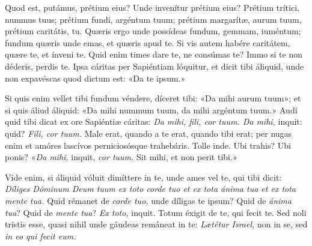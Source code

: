 {\noindent Quod est, putámus, prétium eius? Unde invenítur prétium eius? Prétium trítici, nummus tuus; prétium fundi, argéntum tuum; prétium margarítæ, aurum tuum, prétium caritátis, tu. Quæris ergo unde possídeas fundum, gemmam, iuméntum; fundum quæris unde emas, et quæris apud te. Si vis autem habére caritátem, quære te, et ínveni te. Quid enim times dare te, ne consúmas te? Immo si te non déderis, perdis te. Ipsa cáritas per Sapiéntiam lóquitur, et dicit tibi áliquid, unde non expavéscas quod dictum est: «Da te ipsum.»

\noindent Si quis enim vellet tibi fundum véndere, díceret tibi: «Da mihi aurum tuum»; et si quis áliud áliquid: «Da mihi nummum tuum, da mihi argéntum tuum.» Audi quid tibi dicat ex ore Sapiéntiæ cáritas: \emph{Da mihi, fili, cor tuum. Da mihi,} inquit: quid? \emph{Fili, cor tuum.} Male erat, quando a te erat, quando tibi erat; per nugas enim et amóres lascívos perniciosósque trahebáris. Tolle inde. Ubi trahis? Ubi ponis? «\emph{Da mihi,} inquit, \emph{cor tuum.} Sit mihi, et non perit tibi.»

\noindent Vide enim, si áliquid vóluit dimíttere in te, unde ames vel te, qui tibi dicit: \emph{Díliges Dóminum Deum tuum ex toto corde tuo et ex tota ánima tua et ex tota mente tua.} Quid rémanet de \emph{corde tuo,} unde díligas te ipsum? Quid de \emph{ánima tua}? Quid de \emph{mente tua}? \emph{Ex toto,} inquit. Totum éxigit de te, qui fecit te. Sed noli tristis esse, quasi nihil unde gáudeas remáneat in te: \emph{Lætétur Israel,} non in se, sed \emph{in eo qui fecit eum.}

\vfill
\pagebreak

 

\vspace{-5mm}



\vspace{3mm}

 

\vspace{-5mm}


\vfill
\pagebreak
}
\newcommand{\responsoriumbreve}{\pars{Responsorium breve.}

\cuminitiali{VI}{temporalia/resp-christefilidei.gtex}}
